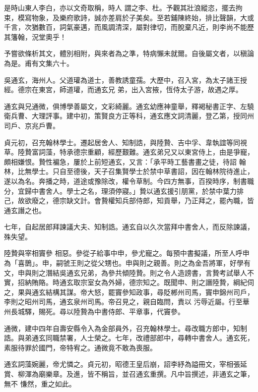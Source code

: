 \begin{pinyinscope}
 是時山東人李白，亦以文奇取稱，時人
 謂之李、杜。予觀其壯浪縱恣，擺去拘束，模寫物象，及樂府歌詩，誠亦差肩於子美矣。至若鋪陳終始，排比聲韻，大或千言，次猶數百，詞氣豪邁，而風調清深，屬對律切，而脫棄凡近，則李尚不能歷其籓翰，況堂奧乎！



 予嘗欲條析其文，體別相附，與來者為之準，特病懶未就爾。自後屬文者，以稹論為是。甫有文集六十。



 吳通玄，海州人。父道瓘為道士，善教誘童孺。大歷中，召入宮，為太子諸王授經。德宗在東宮，師道瓘，而通玄兄
 弟，出入宮掖，恆侍太子游，故遇之厚。



 通玄與兄通微，俱博學善屬文，文彩綺麗。通玄幼應神童舉，釋褐秘書正字、左驍衛兵曹、大理評事。建中初，策賢良方正等科，通玄應文詞清麗，登乙第，授同州司戶、京兆戶曹。



 貞元初，召充翰林學士。遷起居舍人、知制誥，與陸贄、吉中孚、韋執誼等同視草。陸贄富詞藻，特承德宗重顧，經歷艱難。通玄弟兄又以東宮侍上，由是爭寵，頗相嫌恨。贄性褊急，屢於上前短通玄，又言：「承平時工藝書畫之徒，待詔
 翰林，比無學士。只自至德後，天子召集賢學士於禁中草書詔，因在翰林院待進止，遂以為名。奔播之時，道途或豫除改，權令草制。今四方無事，百揆時序，制書職分，宜歸中書舍人。學士之名，理須停寢。」贄以通玄援引朋黨，於禁中葉力排己，故欲廢之，德宗缺文計。會贄權知兵部侍郎，知貢舉，乃正拜之，罷內職，皆通玄譖之也。



 七年，自起居郎拜諫議大夫、知制誥。通玄自以久次當拜中書舍人，而反除諫議，殊失望。



 陸贄與宰相竇參
 相惡。參從子給事中申，參尤寵之。每預中書擬議，所至人呼申為「喜鵲」。申，嗣虢王則之從父甥也。申與則之親善。則之為金吾將軍，好學有文，申與則之潛結吳通玄兄弟，為參共傾陸贄。則之令人造謗書，言贄考試舉人不實，招納賄賂。時通玄取宗室女為外婦，德宗知之。既聞申、則之譖陸贄，綱紀伺之，果與通玄結構其謀。帝大怒，罷竇參知政事，尋貶郴州司馬，竇申錦州司戶，李則之昭州司馬，通玄泉州司馬。帝召見之，親自臨問，責以
 污辱近屬。行至華州長城驛，賜死。尋以陸贄為中書侍郎、平章事，代竇參。



 通微，建中四年自壽安縣令入為金部員外，召充翰林學士。尋改職方郎中，知制誥。與弟通玄同職禁署，人士榮之。七年，改禮部郎中，尋轉中書舍人。通玄死，素服待罪於國門，帝特宥之。通微竟不敢為喪服。



 通玄詞藻婉麗，帝尤憐之。貞元初，昭德王皇后崩，詔李紓為謚冊文，宰相張延賞、柳渾為廟樂章。及進，皆不稱旨，並召通玄重撰。凡中旨撰述，非通玄之筆，無不
 慊然，重之如此。




\end{pinyinscope}
